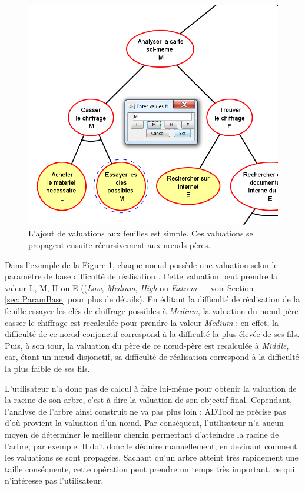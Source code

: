 	\begin{figure}[h]
            \centering
            \includegraphics[width=1\textwidth]{figure/adtool_add_values.png}
            \caption{L'ajout de valuations aux feuilles est simple. Ces valuations se propagent ensuite récursivement aux nœuds-pères.}
            \label{fig:arbre_exemple_1}
    \end{figure}
	
	Dans l'exemple de la {\sc Figure} \ref{fig:arbre_exemple_1}, chaque noeud possède une valuation selon le paramètre de base \og difficulté de réalisation \fg{}. Cette valuation peut prendre la valeur L, M, H ou E ((\emph{Low}, \emph{Medium}, \emph{High} ou \emph{Extrem} --- voir Section \ref{sec::ParamBase} pour plus de détails). En éditant la difficulté de réalisation de la feuille \og essayer les clés de chiffrage possibles \fg{}  à \emph{Medium}, la valuation du nœud-père \og casser le chiffrage \fg{} est recalculée pour prendre la valeur \emph{Medium} : en effet, la difficulté de ce nœud conjonctif correspond à la difficulté la plus élevée de ses fils. Puis, à son tour, la valuation du père de ce nœud-père est recalculée à \emph{Middle}, car, étant un nœud disjonctif, sa difficulté de réalisation correspond à la difficulté la plus faible de ses fils.
	
	L'utilisateur n'a donc pas de calcul à faire lui-même pour obtenir la valuation de la racine de son arbre, c'est-à-dire la valuation de son objectif final. Cependant, l'analyse de l'arbre ainsi construit ne va pas plus loin : ADTool ne précise pas d'où provient la valuation d'un nœud. Par conséquent, l'utilisateur n'a aucun moyen de déterminer le \og meilleur chemin \fg{} permettant d'atteindre la racine de l'arbre, par exemple. Il doit donc le déduire manuellement, en devinant comment les valuations se sont propagées. Sachant qu'un arbre atteint très rapidement une taille conséquente, cette opération peut prendre un temps très important, ce qui n'intéresse pas l'utilisateur.
	
